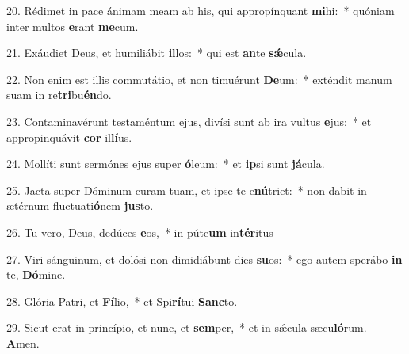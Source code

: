 20. Rédimet in pace ánimam meam ab his, qui appropínquant \textbf{mi}hi:~*  quóniam inter multos \textbf{e}rant \textbf{me}cum.\

21. Exáudiet Deus, et humiliábit \textbf{il}los:~*  qui est \textbf{an}te \textbf{sǽ}cula.\

22. Non enim est illis commutátio, et non timuérunt \textbf{De}um:~*  exténdit manum suam in re\textbf{tri}bu\textbf{én}do.\

23. Contaminavérunt testaméntum ejus, divísi sunt ab ira vultus \textbf{e}jus:~*  et appropinquávit \textbf{cor} il\textbf{lí}us.\

24. Mollíti sunt sermónes ejus super \textbf{ó}leum:~*  et \textbf{ip}si sunt \textbf{já}cula.\

25. Jacta super Dóminum curam tuam, et ipse te e\textbf{nú}triet:~*  non dabit in ætérnum fluctuati\textbf{ó}nem \textbf{jus}to.\

26. Tu vero, Deus, dedúces \textbf{e}os,~*  in púte\textbf{um} in\textbf{tér}itus\

27. Viri sánguinum, et dolósi non dimidiábunt dies \textbf{su}os:~*  ego autem sperábo \textbf{in} te, \textbf{Dó}mine.\

28. Glória Patri, et \textbf{Fí}lio,~*  et Spi\textbf{rí}tui \textbf{Sanc}to.\

29. Sicut erat in princípio, et nunc, et \textbf{sem}per,~*  et in sǽcula sæcu\textbf{ló}rum. \textbf{A}men.\

